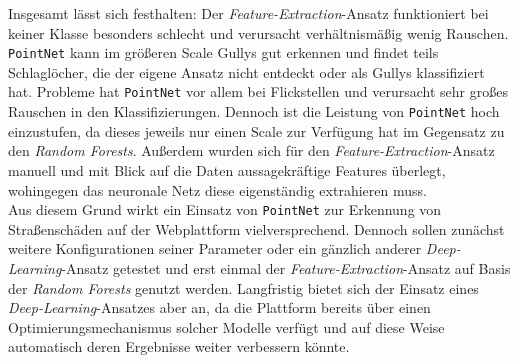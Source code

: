 Insgesamt lässt sich festhalten: Der \textit{Feature-Extraction}-Ansatz funktioniert bei keiner Klasse besonders schlecht und verursacht verhältnismäßig wenig Rauschen. \texttt{PointNet} kann im größeren Scale Gullys gut erkennen und findet teils Schlaglöcher, die der eigene Ansatz nicht entdeckt oder als Gullys klassifiziert hat. Probleme hat \texttt{PointNet} vor allem bei Flickstellen und verursacht sehr großes Rauschen in den Klassifizierungen. Dennoch ist die Leistung von \texttt{PointNet} hoch einzustufen, da dieses jeweils nur einen Scale zur Verfügung hat im Gegensatz zu den \textit{Random Forests}. Außerdem wurden sich für den \textit{Feature-Extraction}-Ansatz manuell und mit Blick auf die Daten aussagekräftige Features überlegt, wohingegen das neuronale Netz diese eigenständig extrahieren muss. \\
Aus diesem Grund wirkt ein Einsatz von \texttt{PointNet} zur Erkennung von Straßenschäden auf der Webplattform vielversprechend. Dennoch sollen zunächst weitere Konfigurationen seiner Parameter oder ein gänzlich anderer \textit{Deep-Learning}-Ansatz getestet und erst einmal der \textit{Feature-Extraction}-Ansatz auf Basis der \textit{Random Forests} genutzt werden. Langfristig bietet sich der Einsatz eines \textit{Deep-Learning}-Ansatzes aber an, da die Plattform bereits über einen Optimierungsmechanismus solcher Modelle verfügt und auf diese Weise automatisch deren Ergebnisse weiter verbessern könnte.